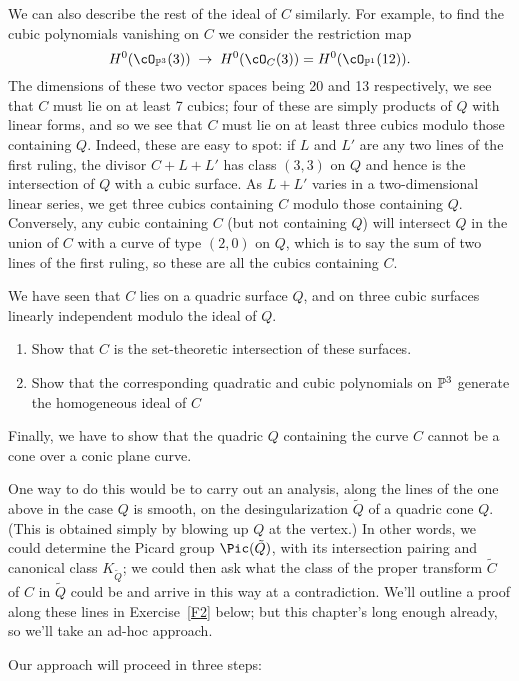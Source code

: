 We can also describe the rest of the ideal of $C$ similarly. For example, to find the cubic polynomials vanishing on $C$ we consider the restriction map
$$
H^0(\cO_{\PP^3}(3)) \; \to \; H^0(\cO_{C}(3)) = H^0(\cO_{\PP^1}(12)).
$$
The dimensions of these two vector spaces being 20 and 13 respectively, we see that $C$ must lie on at least 7 cubics; four of these are simply products of $Q$ with linear forms, and so we see that $C$ must lie on at least three cubics modulo those containing $Q$. Indeed, these are easy to spot: if $L$ and $L'$ are any two lines of the first ruling, the divisor $C + L + L'$ has class $(3,3)$ on $Q$ and hence is the intersection of $Q$ with a cubic surface. As $L+L'$ varies in a two-dimensional linear series, we get three cubics containing $C$ modulo those containing $Q$. Conversely, any cubic containing $C$ (but not containing $Q$) will intersect $Q$ in the union of $C$ with a curve of type $(2,0)$ on $Q$, which is to say the sum of two lines of the first ruling, so these are all the cubics containing $C$.

\begin{exercise}
We have seen that $C$ lies on a quadric surface $Q$, and on three cubic surfaces linearly independent modulo the ideal of $Q$.
\begin{enumerate}
\item Show that $C$ is the set-theoretic intersection of these surfaces.
\item Show that the corresponding quadratic and cubic polynomials on $\PP^3$ generate the homogeneous ideal of $C$
\end{enumerate}
\end{exercise}

Finally, we have to show that the quadric $Q$ containing the curve $C$ cannot be a cone over a conic plane curve. 

One way to do this would be to carry out an analysis, along the lines of the one above in the case $Q$ is smooth, on the desingularization $\tilde Q$ of a quadric cone $Q$. (This is obtained simply by  blowing up $Q$ at the vertex.) In other words, we could determine the Picard group $\Pic(\tilde Q)$, with its intersection pairing and canonical class $K_{\tilde Q}$; we could then ask what the class of the proper transform $\tilde C$ of $C$ in $\tilde Q$ could be and arrive in this way at a contradiction. We'll outline a proof along these lines in Exercise~\ref{F2} below; but this chapter's long enough already, so we'll take an ad-hoc approach.

Our approach will proceed in three steps:

